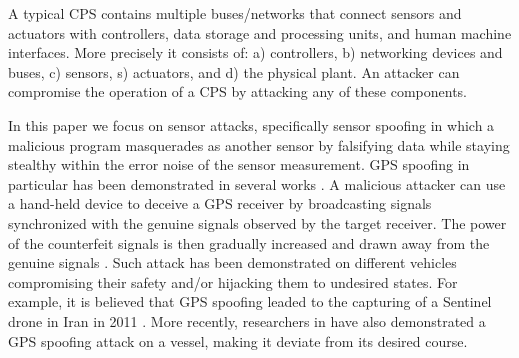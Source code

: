 \documentclass[conference]{IEEEtran}
\begin{document}
A typical CPS contains multiple buses/networks that connect sensors and actuators with controllers, data storage and processing units, and human machine interfaces. More precisely it consists of: a) controllers, b) networking devices and buses, c) sensors, s) actuators, and d) the physical plant. An attacker can compromise the operation of a CPS by attacking any of these components. 

In this paper we focus on sensor attacks, specifically sensor spoofing in which a malicious program masquerades as another sensor by falsifying data while staying stealthy within the error noise of the sensor measurement. GPS spoofing in particular has been demonstrated in several works \cite{humphreys2008assessing, protecting_gps_2016, peterson_faramarzi_2011}. A malicious attacker can use a hand-held device to deceive a GPS receiver by broadcasting signals synchronized with the genuine signals observed by the target receiver. The power of the counterfeit signals is then gradually increased and drawn away from the genuine signals \cite{humphreys2008assessing}. Such attack has been demonstrated on different vehicles compromising their safety and/or hijacking them to undesired states.
%
%
For example, it is believed that GPS spoofing leaded to the capturing of a Sentinel drone in Iran in 2011 \cite{peterson_faramarzi_2011}. More recently, researchers in \cite{protecting_gps_2016} have also demonstrated a GPS spoofing attack on a vessel, making it deviate from its desired course.
 
\end{document}
